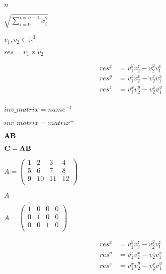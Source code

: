 \documentclass{article}
\begin{document}
$ n $
\pagebreak

$ \sqrt{\sum_{i=0}^{i=n-1}x_i^2} $
\pagebreak

$ v_1,v_2 \in \mathbb{R}^3 $
\pagebreak

$ res = v_1 \times v_2 $
\pagebreak

\begin{eqnarray*} res^x &= v_1^y v_2^z - v_2^y v_1^x \\ res^y &= v_1^z v_2^x - v_2^z v_1^x \\ res^z &= v_1^x v_2^y - v_2^x v_1^y \\ \end{eqnarray*}
\pagebreak

$ inv\_matrix = name^{-1} $
\pagebreak

$ inv\_matrix = matrix^{+} $
\pagebreak

$ {\bf A B} $
\pagebreak

$ {\bf C} = {\bf AB} $
\pagebreak

$ A = \left( \begin{matrix} 1 & 2 & 3 & 4 \\ 5 & 6 & 7 & 8 \\ 9 & 10& 11& 12 \\ \end{matrix} \right) $
\pagebreak

$ A$
\pagebreak

$ A = \left( \begin{matrix} 1 & 0 & 0 & 0 \\ 0 & 1 & 0 & 0 \\ 0 & 0 & 1 & 0 \\ \end{matrix} \right) $
\pagebreak

\begin{eqnarray*} res^x &= v_1^y v_2^z - v_2^y v_1^z \\ res^y &= v_1^z v_2^x - v_2^z v_1^x \\ res^z &= v_1^x v_2^y - v_2^x v_1^y \\ \end{eqnarray*}
\pagebreak
\end{document}
